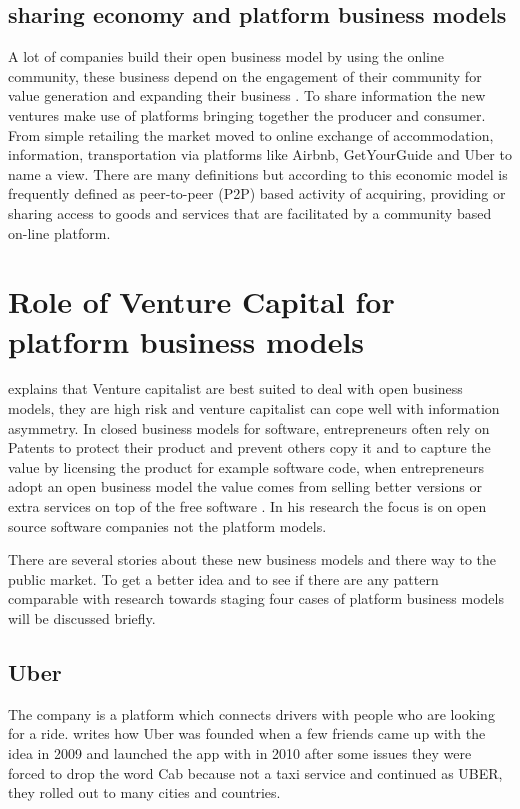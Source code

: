 \documentclass[a4paper, 11pt]{article}
\begin{document}
\subsection{sharing economy and platform business models}
A lot of companies build their open business model by using the online community, these business depend on the engagement of their community for value generation and expanding their business \citep{colombo2016open}. To share information the new ventures make use of platforms bringing together the producer and consumer. From simple retailing the market moved to online exchange of accommodation, information, transportation via platforms like Airbnb, GetYourGuide and Uber to name a view. There are many definitions but according to \cite{investopia} this economic model is frequently defined as peer-to-peer (P2P) based activity of acquiring, providing or sharing access to goods and services that are facilitated by a community based on-line platform.



\section{Role of Venture Capital for platform business models}

\cite{colombo2016open} explains that Venture capitalist are best suited to deal with open business models, they are high risk and venture capitalist can cope well with information asymmetry. In closed business models for software, entrepreneurs often rely on Patents to protect their product and prevent others copy it and to capture the value by licensing the product for example software code, when entrepreneurs adopt an open business model the value comes from selling better versions or extra services on top of the free software \citep{colombo2016open}. In his research the focus is on open source software companies not the platform models.


There are several stories about these new business models and there way to the public market. To get a better idea and to see if there are any pattern comparable with \cite{colombo2016open} research towards staging four cases of platform business models will be discussed briefly.


\subsection{Uber}

The company is a platform which connects drivers with people who are looking for a ride. \cite{griswold} writes how Uber was founded when a few friends came up with the idea in 2009 and launched the app with in 2010 after some issues they were forced to drop the word Cab because not a taxi service and continued as UBER, they rolled out to many cities and countries.
\end{document}
